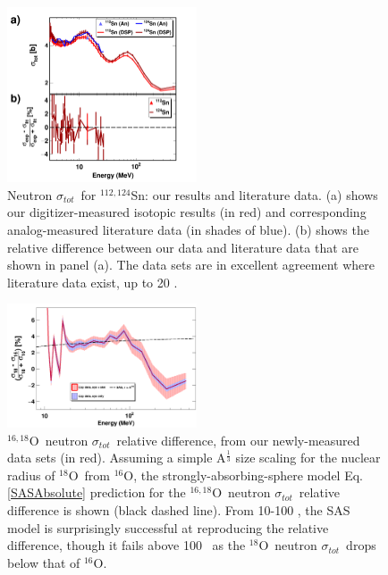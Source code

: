 \documentclass[twocolumn,secnumarabic,amssymb, nobibnotes, aps, prl,
superscriptaddress, nobalancelastpage]{revtex4}
\newcommand{\tot}{\ensuremath{\sigma_{tot}}}
\newcommand{\oSix}{\ensuremath{^{16}}O}
\newcommand{\oEight}{\ensuremath{^{18}}O}
\newcommand{\oSixEight}{\ensuremath{^{16,18}}O}
\newcommand{\snTwelveFour}{\ensuremath{^{112,124}}S\lowercase{n}}
\begin{document}
\begin{figure}[tb]
    \centering
    \includegraphics[width=0.5\textwidth]{figures/TwoPanelSn.png}
    \caption[Neutron \tot\ for \snTwelveFour: our results and literature data]
    {
        Neutron \tot\ for \snTwelveFour: our results and literature data.
        (a) shows our digitizer-measured isotopic results (in red) and
        corresponding analog-measured literature data \cite{Harper1982, Timokhov1989, 
        Rapaport1980, Dukarevich1967} (in shades of blue).
        (b) shows the relative difference between our data
        and literature data that are shown in panel (a). The data sets are in
        excellent agreement where literature data exist, up to 20 \mega\electronvolt.
    }
    \label{TwoPanelSn}
\end{figure}

\begin{figure}[tb]
    \centering
    \includegraphics[width=0.5\textwidth]{figures/relativeDiff_O18O16.png}
    \caption[\oSixEight\ neutron \tot\ relative difference]
    {\oSixEight\ neutron \tot\ relative difference, from our newly-measured
        data sets (in red). Assuming a simple A$^{\frac{1}{3}}$ size scaling for the
        nuclear radius of \oEight\ from \oSix, the strongly-absorbing-sphere model 
        Eq. \ref{SASAbsolute} prediction for the \oSixEight\ neutron \tot\ relative
        difference is shown (black dashed line). From 10-100 \mega\electronvolt, the SAS
        model is surprisingly successful at reproducing the relative difference,
        though it fails above 100 \mega\electronvolt\ as the \oEight\ neutron \tot\ drops below
    that of \oSix.}
    \label{IsotopicDifferenceO}
\end{figure}
\end{document}
